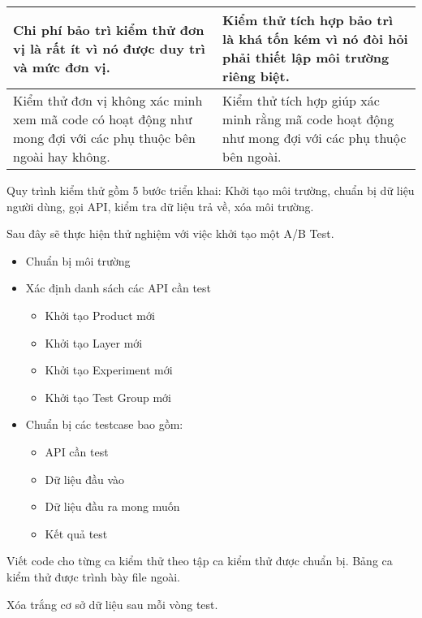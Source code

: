 \begin{table}[H]
\begin{tabular}{|p{8cm}|p{8cm}|}
		Chi phí bảo trì kiểm thử đơn vị là rất ít vì nó được duy trì và mức đơn vị.                                                                               & Kiểm thử tích hợp bảo trì là khá tốn kém vì nó đòi hỏi phải thiết lập môi trường riêng biệt.                                                 \\ \hline
		Kiểm thử đơn vị không xác minh xem mã code có hoạt động như mong đợi với các phụ thuộc bên ngoài hay không.                                               & Kiểm thử tích hợp giúp xác minh rằng mã code hoạt động như mong đợi với các phụ thuộc bên ngoài.                                             \\ \hline
	\end{tabular}
\end{table}

Quy trình kiểm thử gồm 5 bước triển khai: Khởi tạo môi trường, chuẩn bị dữ liệu người dùng, gọi API, kiểm tra dữ liệu trả về, xóa môi trường.


Sau đây sẽ thực hiện thử nghiệm với việc khởi tạo một A/B Test.

\begin{itemize}
	\item Chuẩn bị môi trường
	\item Xác định danh sách các API cần test
	      \begin{itemize}
		      \item Khởi tạo Product mới
		      \item Khởi tạo Layer mới
		      \item Khởi tạo Experiment mới
		      \item Khởi tạo Test Group mới
	      \end{itemize}
	\item Chuẩn bị các testcase bao gồm:
	      \begin{itemize}
		      \item API cần test
		      \item Dữ liệu đầu vào
		      \item Dữ liệu đầu ra mong muốn
		      \item Kết quả test
	      \end{itemize}
\end{itemize}

Viết code cho từng ca kiểm thử theo tập ca kiểm thử được chuẩn bị. Bảng ca kiểm thử được trình bày file ngoài.

Xóa trắng cơ sở dữ liệu sau mỗi vòng test.

